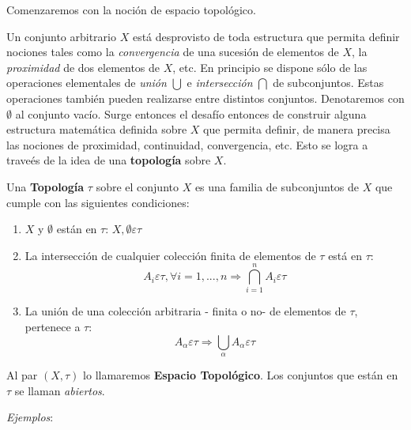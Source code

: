 Comenzaremos con la noci\'on de espacio topol\'ogico.

Un conjunto arbitrario $X$ est\'a desprovisto de toda estructura que permita definir nociones tales como la {\it convergencia} de una sucesi\'on de elementos de $X$, la {\it proximidad} de dos elementos de $X$, etc. En principio se dispone s\'olo de las operaciones elementales de {\it uni\'on} $\bigcup$ e {\it intersecci\'on} $\bigcap$ de subconjuntos. Estas operaciones tambi\'en pueden realizarse entre distintos conjuntos. Denotaremos con $\emptyset$ al conjunto vac\'io. Surge entonces el desaf\'io entonces de construir alguna estructura matem\'atica definida sobre $X$ que permita definir, de manera precisa las nociones de proximidad, continuidad, convergencia, etc. Esto se logra a trave\'es de la idea de una {\bf topolog\'ia} sobre $X$.

\begin{definicion}
 Una {\bf Topolog\'ia} $\tau$ sobre el conjunto $X$ es una familia de subconjuntos de $X$ que cumple con las siguientes condiciones:
\begin{enumerate}
\item $X$ y $\emptyset$ est\'an en $\tau$: $X, \emptyset \varepsilon \tau$
\item La intersecci\'on de cualquier colecci\'on finita de elementos de $\tau$ est\'a en $\tau$:
\[
A_i \varepsilon \tau, \forall i=1,...,n \Rightarrow \bigcap_{i=1}^n A_i \varepsilon \tau
\]
\item La uni\'on de una colecci\'on arbitraria - finita o no- de elementos de $\tau$, pertenece a $\tau$:
\[
A_{\alpha} \varepsilon \tau \Rightarrow \bigcup_{\alpha} A_{\alpha} \varepsilon \tau
\]
\end{enumerate}
\end{definicion}

\begin{definicion}
Al par $(X,\tau)$ lo llamaremos {\bf Espacio Topol\'ogico}. Los conjuntos que est\'an en $\tau$ se llaman {\it abiertos}.
\end{definicion}

{\it Ejemplos}:

